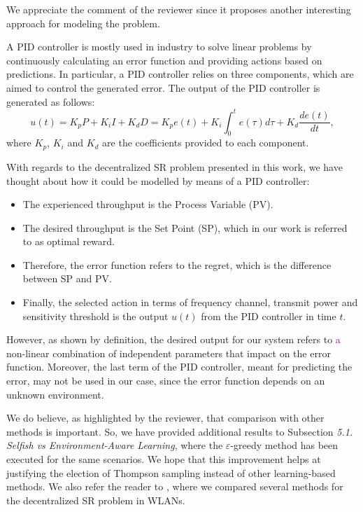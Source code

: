 \documentclass[a4paper,twoside,11pt]{reviewresponse}
\newcommand{\cc}[1]{\textcolor{purple}{#1}}
\begin{document}
	We appreciate the comment of the reviewer since it proposes another interesting approach for modeling the problem. 
	
	A PID controller is mostly used in industry to solve linear problems by continuously calculating an error function and providing actions based on predictions. In particular, a PID controller relies on three components, which are aimed to control the generated error. The output of the PID controller is generated as follows:
	\begin{equation}
	    u(t) =  K_p P + K_i I + K_d D = K_p e(t) + K_i \int_{0}^{t} e(\tau) d \tau + K_d \frac{d e(t)}{dt},
	\end{equation}
	where $K_p$, $K_i$ and $K_d$ are the coefficients provided to each component.

	With regards to the decentralized SR problem presented in this work, we have thought about how it could be modelled by means of a PID controller:
	\begin{itemize}
	    \item The experienced throughput is the Process Variable (PV).
        \item The desired throughput is the Set Point (SP), which in our work is referred to as optimal reward.
        \item Therefore, the error function refers to the regret, which is the difference between SP and PV.
        \item Finally, the selected action in terms of frequency channel, transmit power and sensitivity threshold is the output $u(t)$ from the PID controller in time $t$.
	\end{itemize}
	
    However, as shown by definition, the desired output for our system refers to \cc{a} non-linear combination of independent parameters that impact on the error function. Moreover, the last term of the PID controller, meant for predicting the error, may not be used in our case, since the error function depends on an unknown environment.
    
    We do believe, as highlighted by the reviewer, that comparison with other methods is important. So, we have provided additional results to Subsection \textit{5.1. Selfish vs Environment-Aware Learning}, where the $\varepsilon$-greedy method has been executed for the same scenarios. We hope that this improvement helps at justifying the election of Thompson sampling instead of other learning-based methods. We also refer the reader to \cite{wilhelmi2017collaborative}, where we compared several methods for the decentralized SR problem in WLANs.
\end{document}
